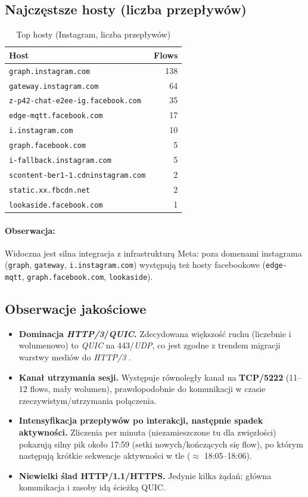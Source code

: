 \subsection{Najczęstsze hosty (liczba przepływów)}
\begin{table}[H]
  \centering
  \caption{Top hosty (Instagram, liczba przepływów)}
  \label{tab:ig-hosts}
  \begin{tabular}{lr}
    \toprule
    \textbf{Host} & \textbf{Flows} \\
    \midrule
    \texttt{graph.instagram.com} & 138 \\
    \texttt{gateway.instagram.com} & 64 \\
    \texttt{z-p42-chat-e2ee-ig.facebook.com} & 35 \\
    \texttt{edge-mqtt.facebook.com} & 17 \\
    \texttt{i.instagram.com} & 10 \\
    \texttt{graph.facebook.com} & 5 \\
    \texttt{i-fallback.instagram.com} & 5 \\
    \texttt{scontent-ber1-1.cdninstagram.com} & 2 \\
    \texttt{static.xx.fbcdn.net} & 2 \\
    \texttt{lookaside.facebook.com} & 1 \\
    \bottomrule
  \end{tabular}
\end{table}

\paragraph{Obserwacja:}
Widoczna jest silna integracja z infrastrukturą Meta: poza domenami instagrama (\texttt{graph}, \texttt{gateway}, \texttt{i.instagram.com}) występują też hosty facebookowe (\texttt{edge-mqtt}, \texttt{graph.facebook.com}, \texttt{lookaside}).

\subsection{Obserwacje jakościowe}
\begin{itemize}
  \item \textbf{Dominacja \emph{HTTP/3}/\emph{QUIC}.} Zdecydowana większość ruchu (liczebnie i wolumenowo) to \emph{QUIC} na 443/\emph{UDP}, co jest zgodne z trendem migracji warstwy mediów do \emph{HTTP/3} \cite{RFC9114,RFC9000}.
  \item \textbf{Kanał utrzymania sesji.} Występuje równoległy kanał na \textbf{TCP/5222} (11--12 flows, mały wolumen), prawdopodobnie do komunikacji w czasie rzeczywistym/utrzymania połączenia.
  \item \textbf{Intensyfikacja przepływów po interakcji, następnie spadek aktywności.} Zliczenia per minuta (niezamieszczone tu dla zwięzłości) pokazują silny pik około 17{:}59 (setki nowych/kończących się flow), po którym następują krótkie sekwencje aktywności w tle ($\approx$ 18{:}05–18{:}06).
  \item \textbf{Niewielki ślad HTTP/1.1/HTTPS.} Jedynie kilka żądań; główna komunikacja i zasoby idą ścieżką QUIC.
\end{itemize}

